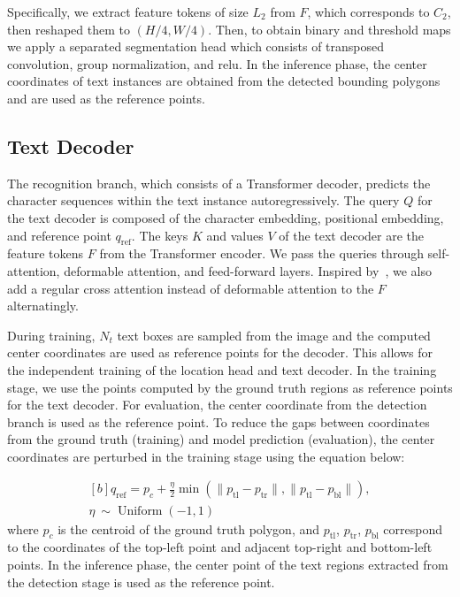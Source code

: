 \documentclass[10pt,twocolumn,letterpaper]{article}
\begin{document}
Specifically, we extract feature tokens of size \(L_2\) from \(F\), which corresponds to \(C_2\), then reshaped them to \((H/4, W/4)\). Then, to obtain binary and threshold maps we apply a separated segmentation head which consists of transposed convolution, group normalization, and relu. In the inference phase, the center coordinates of text instances are obtained from the detected bounding polygons and are used as the reference points.







\subsection{Text Decoder}

The recognition branch, which consists of a Transformer decoder, predicts the character sequences within the text instance autoregressively. The query \(Q\) for the text decoder is composed of the character embedding, positional embedding, and reference point \(q_{\text{ref}}\). The keys \(K\) and values \(V\) of the text decoder are the feature tokens \(F\) from the Transformer encoder. We pass the queries through self-attention, deformable attention, and feed-forward layers. Inspired by~\cite{zhu2019, li2021panoptic}, we also add a regular cross attention instead of deformable attention to the \(F\) alternatingly.




During training, \(N_t\) text boxes are sampled from the image and the computed center coordinates are used as reference points for the decoder. This allows for the independent training of the location head and text decoder. In the training stage, we use the points computed by the ground truth regions as reference points for the text decoder. For evaluation, the center coordinate from the detection branch is used as the reference point. To reduce the gaps between coordinates from the ground truth (training) and model prediction (evaluation), the center coordinates are perturbed in the training stage using the equation below:

\begin{equation}
\begin{gathered}[b]
q_{\text{ref}} = p_c + \frac{\eta}{2} \operatorname{min}(\|p_{\text{tl}} - p_{\text{tr}}\|, \|p_{\text{tl}} - p_{\text{bl}}\|), \\
\eta ~ \sim \operatorname{Uniform}(-1, 1)
\end{gathered}
\label{eq:perturb}
\end{equation}
where \(p_c\) is the centroid of the ground truth polygon, and \(p_{\text{tl}}\), \(p_{\text{tr}}\), \(p_{\text{bl}}\) correspond to the coordinates of the top-left point and adjacent top-right and bottom-left points. In the inference phase, the center point of the text regions extracted from the detection stage is used as the reference point. 
\end{document}
